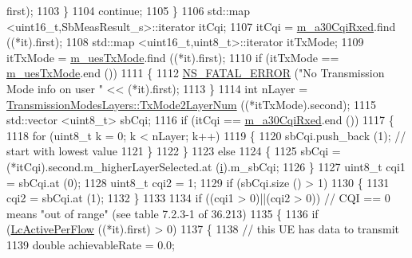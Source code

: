 \begin{DoxyCode}
      first);
1103                     \}
1104                   \textcolor{keywordflow}{continue};
1105                 \}
1106               std::map <uint16\_t,SbMeasResult\_s>::iterator itCqi;
1107               itCqi = \hyperlink{classns3_1_1PfFfMacScheduler_a4bf7d1844112028aa3f7bc21e580a7bd}{m\_a30CqiRxed}.find ((*it).first);
1108               std::map <uint16\_t,uint8\_t>::iterator itTxMode;
1109               itTxMode = \hyperlink{classns3_1_1PfFfMacScheduler_afde3fb192a83a5fafc27ed9a0df82de9}{m\_uesTxMode}.find ((*it).first);
1110               \textcolor{keywordflow}{if} (itTxMode == \hyperlink{classns3_1_1PfFfMacScheduler_afde3fb192a83a5fafc27ed9a0df82de9}{m\_uesTxMode}.end ())
1111                 \{
1112                   \hyperlink{group__fatal_ga5131d5e3f75d7d4cbfd706ac456fdc85}{NS\_FATAL\_ERROR} (\textcolor{stringliteral}{"No Transmission Mode info on user "} << (*it).first);
1113                 \}
1114               \textcolor{keywordtype}{int} nLayer = \hyperlink{classns3_1_1TransmissionModesLayers_a31f608b7bfaa77440fe4cb85ad035329}{TransmissionModesLayers::TxMode2LayerNum}
       ((*itTxMode).second);
1115               std::vector <uint8\_t> sbCqi;
1116               \textcolor{keywordflow}{if} (itCqi == \hyperlink{classns3_1_1PfFfMacScheduler_a4bf7d1844112028aa3f7bc21e580a7bd}{m\_a30CqiRxed}.end ())
1117                 \{
1118                   \textcolor{keywordflow}{for} (uint8\_t k = 0; k < nLayer; k++)
1119                     \{
1120                       sbCqi.push\_back (1);  \textcolor{comment}{// start with lowest value}
1121                     \}
1122                 \}
1123               \textcolor{keywordflow}{else}
1124                 \{
1125                   sbCqi = (*itCqi).second.m\_higherLayerSelected.at (\hyperlink{bernuolliDistribution_8m_a6f6ccfcf58b31cb6412107d9d5281426}{i}).m\_sbCqi;
1126                 \}
1127               uint8\_t cqi1 = sbCqi.at (0);
1128               uint8\_t cqi2 = 1;
1129               \textcolor{keywordflow}{if} (sbCqi.size () > 1)
1130                 \{
1131                   cqi2 = sbCqi.at (1);
1132                 \}
1133 
1134               \textcolor{keywordflow}{if} ((cqi1 > 0)||(cqi2 > 0)) \textcolor{comment}{// CQI == 0 means "out of range" (see table 7.2.3-1 of 36.213)}
1135                 \{
1136                   \textcolor{keywordflow}{if} (\hyperlink{classns3_1_1PfFfMacScheduler_a97f6912a6bb4987ab0a718852b6f8d29}{LcActivePerFlow} ((*it).first) > 0)
1137                     \{
1138                       \textcolor{comment}{// this UE has data to transmit}
1139                       \textcolor{keywordtype}{double} achievableRate = 0.0;

\end{DoxyCode}
